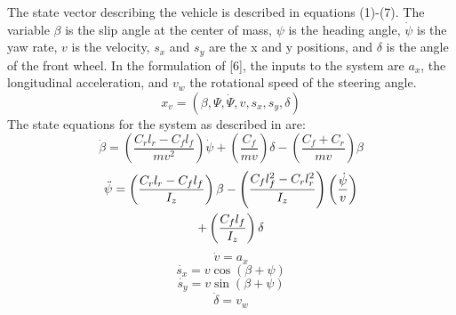The state vector describing the vehicle is described in equations (1)-(7). 
The variable \(\beta\) is the slip angle at the center of mass, \(\psi\) is the heading angle, \(\dot{\psi}\) is the yaw rate, \(v\) is the velocity, \(s_x\) and \(s_y\) are the x and y positions, and \(\delta\) is the angle of the front wheel. In the formulation of [6], the inputs to the system are \(a_x\), the longitudinal acceleration, and \(v_w\) the rotational speed of the steering angle. 
\begin{equation}
x_v = (\beta,\Psi,\dot{\Psi}, v, s_x, s_y, \delta)
\end{equation}	
The state equations for the system as described in \cite{Althoff2014} are:
\begin{equation}
\label{eqn:beta}
\dot{\beta}=\left(\frac{C_rl_r-C_fl_f}{mv^2} \right)\dot{\psi}+\left(\frac{C_f}{mv} \right)\delta-\left(\frac{C_f+C_r}{mv} \right)\beta
\end{equation}
\begin{gather}
\label{eqn:psi}
\ddot{\psi}=\left(\frac{C_rl_r-C_fl_f}{I_z} \right)\beta-\left(\frac{C_fl_f^2-C_rl_r^2}{I_z} \right)\left(\frac{\dot{\psi}}{v} \right) \notag \\
+\left(\frac{C_fl_f}{I_z} \right)\delta
\end{gather}
\begin{equation}
\label{eqn:v}
\dot{v}=a_x
\end{equation}
\begin{equation}
\label{eqn:sx}
\dot{s_x}=v\cos{(\beta+\psi)}
\end{equation}
\begin{equation}
\label{eqn:sy}
\dot{s_y}=v\sin{(\beta+\psi)}	
\end{equation}	
\begin{equation}
\label{eqn:delta}
\dot{\delta}=v_w
\end{equation}